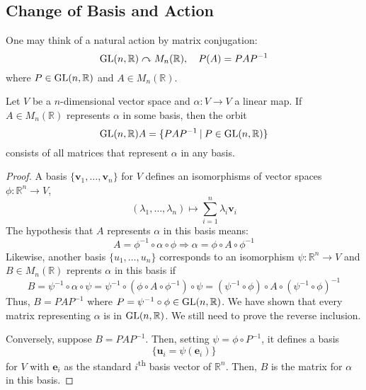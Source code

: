 \documentclass[10pt, a4paper, twoside]{report}
\begin{document}
\subsection{Change of Basis and Action}
One may think of a natural action by matrix conjugation:
\[\operatorname{GL}(n,\mathbb{R})\curvearrowright M_n(\mathbb{R}),\quad P(A)=PAP^{-1}\]
where \(P\in\operatorname{GL}(n,\mathbb{R})\) and \(A\in M_n(\mathbb{R})\).
\begin{proposition}
    Let \(V\) be a \(n\)-dimensional vector space and \(\alpha:V\to V\) a linear map. If \(A\in M_n(\mathbb{R})\) represents \(\alpha\) in some basis, then the orbit 
    \[\operatorname{GL}(n,\mathbb{R})A=\{PAP^{-1}\:|\:P\in\operatorname{GL}(n,\mathbb{R})\}\]
    consists of all matrices that represent \(\alpha\) in any basis.
\end{proposition}
\begin{proof}
    A basis \(\{\mathbf{v}_1,\ldots,\mathbf{v}_n\}\) for \(V\) defines an isomorphisms of vector spaces \(\phi:\mathbb{R}^n\to V\),
    \[(\lambda_1,\ldots,\lambda_n)\mapsto\sum_{i=1}^n\lambda_i\mathbf{v}_i\]
    The hypothesis that \(A\) represents \(\alpha\) in this basis means:
    \[A=\phi^{-1}\circ\alpha\circ\phi\Rightarrow\alpha=\phi\circ A\circ\phi^{-1}\]
    Likewise, another basis \(\{u_1,\ldots,u_n\}\) corresponds to an isomorphism \(\psi:\mathbb{R}^n\to V\) and \(B\in M_n(\mathbb{R})\) reprents \(\alpha\) in this basis if 
    \[B=\psi^{-1}\circ\alpha\circ\psi=\psi^{-1}\circ(\phi\circ A\circ\phi^{-1})\circ\psi=(\psi^{-1}\circ\phi)\circ A\circ(\psi^{-1}\circ\phi)^{-1}\]
    Thus, \(B=PAP^{-1}\) where \(P=\psi^{-1}\circ\phi\in\operatorname{GL}(n,\mathbb{R})\). We have shown that every matrix representing \(\alpha\) is in \(\operatorname{GL}(n,\mathbb{R})\). We still need to prove the reverse inclusion.

    Conversely, suppose \(B=PAP^{-1}\). Then, setting \(\psi=\phi\circ P^{-1}\), it defines a basis 
    \[\{\mathbf{u}_i=\psi(\mathbf{e}_i)\}\]
    for \(V\) with \(\mathbf{e}_i\) as the standard \(i\)\textsuperscript{th}
    basis vector of \(\mathbb{R}^n\). Then, \(B\) is the matrix for \(\alpha\) in this basis.
\end{proof}
\end{document}
